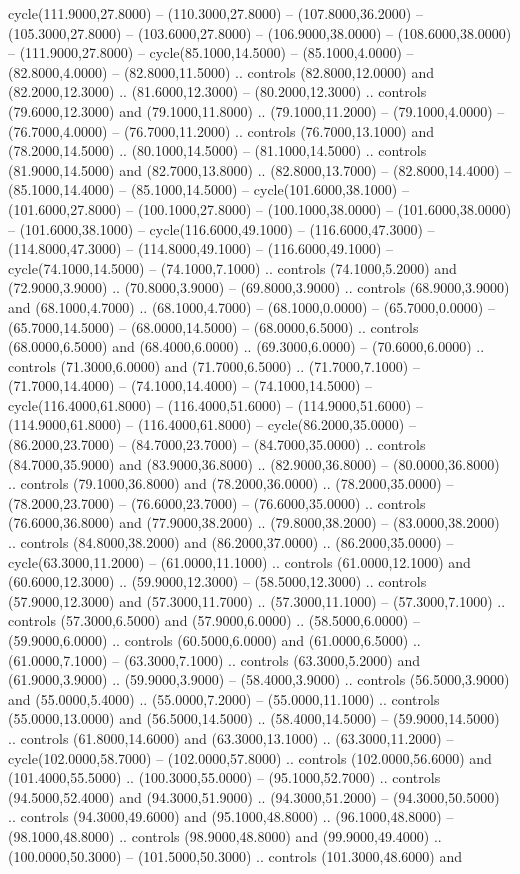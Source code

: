 cycle(111.9000,27.8000) -- (110.3000,27.8000) -- (107.8000,36.2000) -- (105.3000,27.8000) -- (103.6000,27.8000) -- (106.9000,38.0000) -- (108.6000,38.0000) -- (111.9000,27.8000) -- cycle(85.1000,14.5000) -- (85.1000,4.0000) -- (82.8000,4.0000) -- (82.8000,11.5000) .. controls (82.8000,12.0000) and (82.2000,12.3000) .. (81.6000,12.3000) -- (80.2000,12.3000) .. controls (79.6000,12.3000) and (79.1000,11.8000) .. (79.1000,11.2000) -- (79.1000,4.0000) -- (76.7000,4.0000) -- (76.7000,11.2000) .. controls (76.7000,13.1000) and (78.2000,14.5000) .. (80.1000,14.5000) -- (81.1000,14.5000) .. controls (81.9000,14.5000) and (82.7000,13.8000) .. (82.8000,13.7000) -- (82.8000,14.4000) -- (85.1000,14.4000) -- (85.1000,14.5000) -- cycle(101.6000,38.1000) -- (101.6000,27.8000) -- (100.1000,27.8000) -- (100.1000,38.0000) -- (101.6000,38.0000) -- (101.6000,38.1000) -- cycle(116.6000,49.1000) -- (116.6000,47.3000) -- (114.8000,47.3000) -- (114.8000,49.1000) -- (116.6000,49.1000) -- cycle(74.1000,14.5000) -- (74.1000,7.1000) .. controls (74.1000,5.2000) and (72.9000,3.9000) .. (70.8000,3.9000) -- (69.8000,3.9000) .. controls (68.9000,3.9000) and (68.1000,4.7000) .. (68.1000,4.7000) -- (68.1000,0.0000) -- (65.7000,0.0000) -- (65.7000,14.5000) -- (68.0000,14.5000) -- (68.0000,6.5000) .. controls (68.0000,6.5000) and (68.4000,6.0000) .. (69.3000,6.0000) -- (70.6000,6.0000) .. controls (71.3000,6.0000) and (71.7000,6.5000) .. (71.7000,7.1000) -- (71.7000,14.4000) -- (74.1000,14.4000) -- (74.1000,14.5000) -- cycle(116.4000,61.8000) -- (116.4000,51.6000) -- (114.9000,51.6000) -- (114.9000,61.8000) -- (116.4000,61.8000) -- cycle(86.2000,35.0000) -- (86.2000,23.7000) -- (84.7000,23.7000) -- (84.7000,35.0000) .. controls (84.7000,35.9000) and (83.9000,36.8000) .. (82.9000,36.8000) -- (80.0000,36.8000) .. controls (79.1000,36.8000) and (78.2000,36.0000) .. (78.2000,35.0000) -- (78.2000,23.7000) -- (76.6000,23.7000) -- (76.6000,35.0000) .. controls (76.6000,36.8000) and (77.9000,38.2000) .. (79.8000,38.2000) -- (83.0000,38.2000) .. controls (84.8000,38.2000) and (86.2000,37.0000) .. (86.2000,35.0000) -- cycle(63.3000,11.2000) -- (61.0000,11.1000) .. controls (61.0000,12.1000) and (60.6000,12.3000) .. (59.9000,12.3000) -- (58.5000,12.3000) .. controls (57.9000,12.3000) and (57.3000,11.7000) .. (57.3000,11.1000) -- (57.3000,7.1000) .. controls (57.3000,6.5000) and (57.9000,6.0000) .. (58.5000,6.0000) -- (59.9000,6.0000) .. controls (60.5000,6.0000) and (61.0000,6.5000) .. (61.0000,7.1000) -- (63.3000,7.1000) .. controls (63.3000,5.2000) and (61.9000,3.9000) .. (59.9000,3.9000) -- (58.4000,3.9000) .. controls (56.5000,3.9000) and (55.0000,5.4000) .. (55.0000,7.2000) -- (55.0000,11.1000) .. controls (55.0000,13.0000) and (56.5000,14.5000) .. (58.4000,14.5000) -- (59.9000,14.5000) .. controls (61.8000,14.6000) and (63.3000,13.1000) .. (63.3000,11.2000) -- cycle(102.0000,58.7000) -- (102.0000,57.8000) .. controls (102.0000,56.6000) and (101.4000,55.5000) .. (100.3000,55.0000) -- (95.1000,52.7000) .. controls (94.5000,52.4000) and (94.3000,51.9000) .. (94.3000,51.2000) -- (94.3000,50.5000) .. controls (94.3000,49.6000) and (95.1000,48.8000) .. (96.1000,48.8000) -- (98.1000,48.8000) .. controls (98.9000,48.8000) and (99.9000,49.4000) .. (100.0000,50.3000) -- (101.5000,50.3000) .. controls (101.3000,48.6000) and 